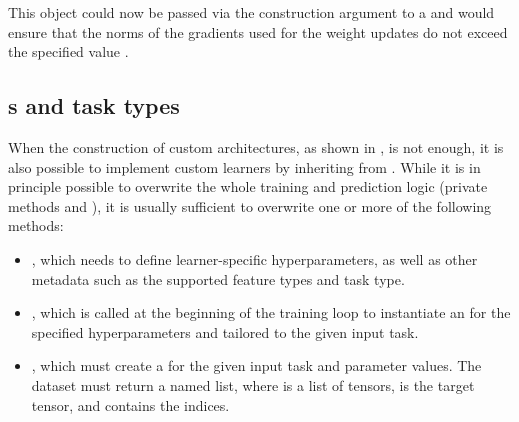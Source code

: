 \documentclass[article]{jss}
\theoremstyle{definition}
\begin{document}

This object could now be passed via the  construction argument to a  and would ensure that the norms of the gradients used for the weight updates do not exceed the specified value .

\subsection[Learners and task types]{s and task types}\label{sec:extending-learner-task}

When the construction of custom architectures, as shown in , is not enough, it is also possible to implement custom learners by inheriting from .
While it is in principle possible to overwrite the whole training and prediction logic (private methods  and ), it is usually sufficient to overwrite one or more of the following methods:

\begin{itemize}
    \item {}, which needs to define learner-specific hyperparameters, as well as other metadata such as the supported feature types and task type.
    \item {}, which is called at the beginning of the training loop to instantiate an  for the specified hyperparameters and tailored to the given input task.
    \item {}, which must create a  for the given input task and parameter values. The dataset must return a named list, where  is a list of tensors,  is the target tensor, and  contains the indices.
\end{itemize}
\end{document}
